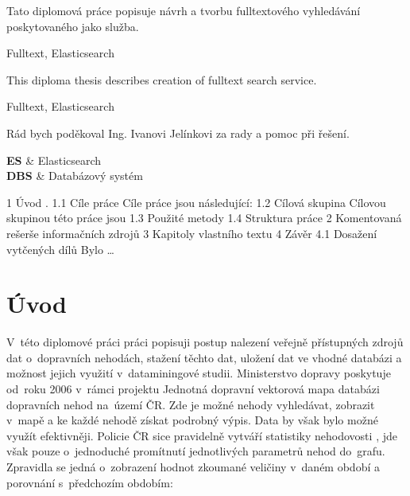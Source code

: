 \documentclass[FM,DP]{tulthesis}
\begin{document}


\begin{abstractCZ}
Tato diplomová práce popisuje návrh a tvorbu fulltextového vyhledávání poskytovaného jako služba.
\end{abstractCZ}

\begin{klicovaslovaCZ}
Fulltext, Elasticsearch
\end{klicovaslovaCZ}

\vspace{2cm}

\begin{abstractEN}
This diploma thesis describes creation of fulltext search service.
\end{abstractEN}

\begin{klicovaslovaEN}
Fulltext, Elasticsearch
\end{klicovaslovaEN}


\begin{acknowledgement}
Rád bych poděkoval Ing. Ivanovi Jelínkovi za rady a pomoc při řešení.
\end{acknowledgement}


\tableofcontents
\clearpage


\begin{abbrList}
\textbf{ES} & Elasticsearch\\
\textbf{DBS} & Databázový systém\\
\end{abbrList}






1 Úvod    .
1.1 Cíle práce
Cíle práce jsou následující:
1.2 Cílová skupina
Cílovou skupinou této práce jsou 
1.3 Použité metody
1.4 Struktura práce
2 Komentovaná rešerše informačních zdrojů
3 Kapitoly vlastního textu
4 Závěr
4.1 Dosažení vytčených dílů
Bylo …



\chapter{Úvod}

V~této diplomové práci práci popisuji postup nalezení veřejně přístupných zdrojů dat o~dopravních nehodách, stažení těchto dat, uložení dat ve vhodné databázi a možnost jejich využití v~dataminingové studii. Ministerstvo dopravy poskytuje od~roku 2006 v~rámci projektu Jednotná dopravní vektorová mapa \cite{jdvm} databázi dopravních nehod na~území ČR. Zde je možné nehody vyhledávat, zobrazit v~mapě a ke každé nehodě získat podrobný výpis. Data by však bylo možné využít efektivněji. Policie ČR sice pravidelně vytváří statistiky nehodovosti \cite{statistika-nehodovosti}, jde však pouze o~jednoduché promítnutí jednotlivých parametrů nehod do~grafu. Zpravidla se jedná o~zobrazení hodnot zkoumané veličiny v~daném období a porovnání s~předchozím obdobím:
\end{document}
